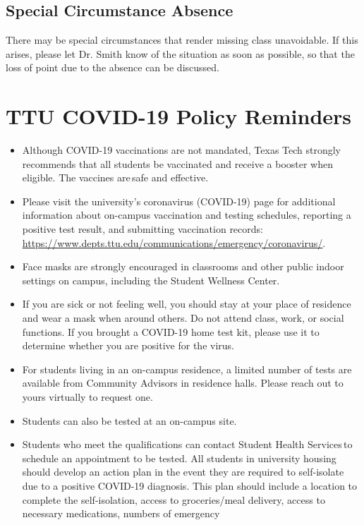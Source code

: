 \documentclass[12pt, notitlepage]{article}   	%
\begin{document}
{\subsection{Special Circumstance Absence}
There may be special circumstances that render missing class unavoidable.
If this arises, please let Dr. Smith know of the situation as soon as possible,
so that the loss of point due to the absence can be discussed.

\section{TTU COVID-19 Policy Reminders}
\begin{itemize}
	\item{Although COVID-19 vaccinations are not mandated, Texas Tech strongly 
	recommends that all students be vaccinated and receive a booster when eligible.
	The vaccines are safe and effective.}
	\item{Please visit the university’s coronavirus (COVID-19) page for additional 
	information about on-campus vaccination and testing schedules, reporting a 
	positive test result, and submitting vaccination records: 
	\url{https://www.depts.ttu.edu/communications/emergency/coronavirus/}.}
	\item{Face masks are strongly encouraged in classrooms and other public indoor 
	settings on campus, including the Student Wellness Center.}
	\item{If you are sick or not feeling well, you should stay at your place of 
	residence and wear a mask when around others.  Do not attend class, work, or social functions. 
	If you brought a COVID-19 home test kit, please use it to determine whether you are 
	positive for the virus.}
	\item{For students living in an on-campus residence, a limited number of tests 
	are available from Community Advisors in residence halls. Please reach out to 
	yours virtually to request one. }
	\item{Students can also be tested at an on-campus site.}
	\item{Students who meet the qualifications can contact Student Health Services to 
	schedule an appointment to be tested. 
	All students in university housing should develop an action plan in the event 
	they are required to self-isolate due to a positive COVID-19 diagnosis. 
	This plan should include a location to complete the self-isolation, access to 
	groceries/meal delivery, access to necessary medications, numbers of emergency 
}
\end{itemize}}
\end{document}
